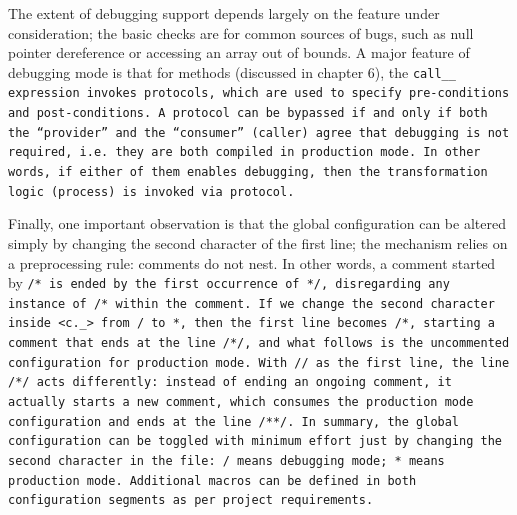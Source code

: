 The extent of debugging support depends
largely on the feature under consideration;
the basic checks are for common sources of bugs,
such as null pointer dereference or accessing an array out of bounds.
A major feature of debugging mode is that
for methods (discussed in chapter 6),
the \tt{call__} expression invokes protocols,
which are used to specify pre-conditions and post-conditions.
A protocol can be bypassed if and only if both the ``provider''
and the ``consumer'' (caller) agree that debugging is not required,
i.e. they are both compiled in production mode.
In other words, if either of them enables debugging,
then the transformation logic (process) is invoked via protocol.

Finally, one important observation is that the global configuration can
be altered simply by changing the second character of the first line;
the mechanism relies on a preprocessing rule: comments do not nest.
In other words, a comment started by \tt{/*} is ended by the first occurrence
of \tt{*/}, disregarding any instance of \tt{/*} within the comment.
If we change the second character inside \tt{<c._>} from \tt{/} to \tt{*},
then the first line becomes \tt{/*},
starting a comment that ends at the line \tt{/*/},
and what follows is the uncommented configuration for production mode.
With \tt{//} as the first line, the line \tt{/*/} acts differently:
instead of ending an ongoing comment, it actually starts a new comment,
which consumes the production mode configuration and ends at the line \tt{/**/}.
In summary, the global configuration can be toggled with
minimum effort just by changing the second character in the file:
\tt{/} means debugging mode; \tt{*} means production mode.
Additional macros can be defined in both
configuration segments as per project requirements.
